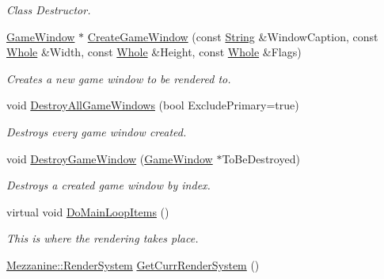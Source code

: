 \begin{DoxyCompactItemize}
\begin{DoxyCompactList}\small\item\em Class Destructor. \item\end{DoxyCompactList}\item 
\hyperlink{classMezzanine_1_1GameWindow}{GameWindow} $\ast$ \hyperlink{classMezzanine_1_1GraphicsManager_a6d5efb7e23d2274bc5d49dd37763e645}{CreateGameWindow} (const \hyperlink{namespaceMezzanine_acf9fcc130e6ebf08e3d8491aebcf1c86}{String} \&WindowCaption, const \hyperlink{namespaceMezzanine_adcbb6ce6d1eb4379d109e51171e2e493}{Whole} \&Width, const \hyperlink{namespaceMezzanine_adcbb6ce6d1eb4379d109e51171e2e493}{Whole} \&Height, const \hyperlink{namespaceMezzanine_adcbb6ce6d1eb4379d109e51171e2e493}{Whole} \&Flags)
\begin{DoxyCompactList}\small\item\em Creates a new game window to be rendered to. \item\end{DoxyCompactList}\item 
void \hyperlink{classMezzanine_1_1GraphicsManager_a9ff5f5d4ed74f97e61fe3e6f170fa0c9}{DestroyAllGameWindows} (bool ExcludePrimary=true)
\begin{DoxyCompactList}\small\item\em Destroys every game window created. \item\end{DoxyCompactList}\item 
void \hyperlink{classMezzanine_1_1GraphicsManager_a0f03feff9d284100bdf7715ec504474c}{DestroyGameWindow} (\hyperlink{classMezzanine_1_1GameWindow}{GameWindow} $\ast$ToBeDestroyed)
\begin{DoxyCompactList}\small\item\em Destroys a created game window by index. \item\end{DoxyCompactList}\item 
virtual void \hyperlink{classMezzanine_1_1GraphicsManager_ae940c81cd1401fda34abc6fd53ede45a}{DoMainLoopItems} ()
\begin{DoxyCompactList}\small\item\em This is where the rendering takes place. \item\end{DoxyCompactList}\item 
\hyperlink{namespaceMezzanine_a1bb0347c37954bc71c4344e4b55c729a}{Mezzanine::RenderSystem} \hyperlink{classMezzanine_1_1GraphicsManager_a9592364a2ecc1b24a2ce50ce88095ffd}{GetCurrRenderSystem} ()

\end{DoxyCompactItemize}
